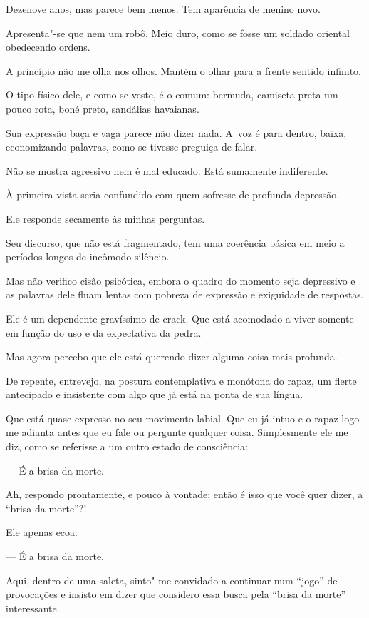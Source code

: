  

Dezenove anos, mas parece bem menos. Tem aparência de menino novo.

Apresenta"-se que nem um robô. Meio duro, como se fosse um soldado
oriental obedecendo ordens.

A princípio não me olha nos olhos. Mantém o olhar para a frente sentido
infinito.

O tipo físico dele, e como se veste, é o comum: bermuda, camiseta preta
um pouco rota, boné preto, sandálias havaianas.

Sua expressão baça e vaga parece não dizer nada. A~voz é para dentro,
baixa, economizando palavras, como se tivesse preguiça de falar.

Não se mostra agressivo nem é mal educado. Está sumamente indiferente.

À primeira vista seria confundido com quem sofresse de profunda
depressão.

Ele responde secamente às minhas perguntas.

Seu discurso, que não está fragmentado, tem uma coerência básica em meio
a períodos longos de incômodo silêncio.

Mas não verifico cisão psicótica, embora o quadro do momento seja
depressivo e as palavras dele fluam lentas com pobreza de expressão e
exiguidade de respostas.

Ele é um dependente gravíssimo de crack. Que está acomodado a viver
somente em função do uso e da expectativa da pedra.

Mas agora percebo que ele está querendo dizer alguma coisa mais
profunda.

De repente, entrevejo, na postura contemplativa e monótona do rapaz, um
flerte antecipado e insistente com algo que já está na ponta de sua
língua.

Que está quase expresso no seu movimento labial. Que eu já intuo e o
rapaz logo me adianta antes que eu fale ou pergunte qualquer coisa.
Simplesmente ele me diz, como se referisse a um outro estado de
consciência:

— É a brisa da morte.

Ah, respondo prontamente, e pouco à vontade: então é isso que você quer
dizer, a ``brisa da morte''?!

Ele apenas ecoa:

— É a brisa da morte.

Aqui, dentro de uma saleta, sinto"-me convidado a continuar num ``jogo''
de provocações e insisto em dizer que considero essa busca pela ``brisa
da morte'' interessante.

